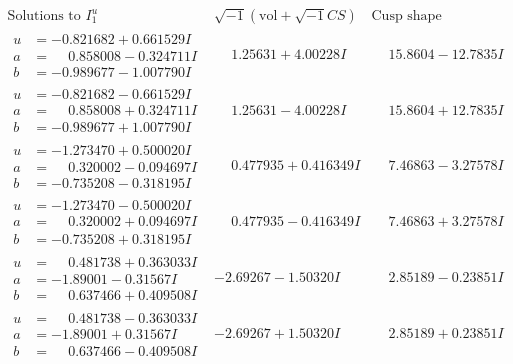 \documentclass[1p]{elsarticle_modified}
\theoremstyle{definition}
\newcommand{\I}{\sqrt{-1}}
\begin{document}
$$\begin{array}{c|c|c}  
\text{Solutions to }I^u_{1}& \I (\text{vol} + \sqrt{-1}CS) & \text{Cusp shape}\\
 \hline 
\begin{aligned}
u &= -0.821682 + 0.661529 I \\
a &= \phantom{-}0.858008 - 0.324711 I \\
b &= -0.989677 - 1.007790 I\end{aligned}
 & \phantom{-}1.25631 + 4.00228 I & \phantom{-}15.8604 - 12.7835 I \\ \hline\begin{aligned}
u &= -0.821682 - 0.661529 I \\
a &= \phantom{-}0.858008 + 0.324711 I \\
b &= -0.989677 + 1.007790 I\end{aligned}
 & \phantom{-}1.25631 - 4.00228 I & \phantom{-}15.8604 + 12.7835 I \\ \hline\begin{aligned}
u &= -1.273470 + 0.500020 I \\
a &= \phantom{-}0.320002 - 0.094697 I \\
b &= -0.735208 - 0.318195 I\end{aligned}
 & \phantom{-}0.477935 + 0.416349 I & \phantom{-}7.46863 - 3.27578 I \\ \hline\begin{aligned}
u &= -1.273470 - 0.500020 I \\
a &= \phantom{-}0.320002 + 0.094697 I \\
b &= -0.735208 + 0.318195 I\end{aligned}
 & \phantom{-}0.477935 - 0.416349 I & \phantom{-}7.46863 + 3.27578 I \\ \hline\begin{aligned}
u &= \phantom{-}0.481738 + 0.363033 I \\
a &= -1.89001 - 0.31567 I \\
b &= \phantom{-}0.637466 + 0.409508 I\end{aligned}
 & -2.69267 - 1.50320 I & \phantom{-}2.85189 - 0.23851 I \\ \hline\begin{aligned}
u &= \phantom{-}0.481738 - 0.363033 I \\
a &= -1.89001 + 0.31567 I \\
b &= \phantom{-}0.637466 - 0.409508 I\end{aligned}
 & -2.69267 + 1.50320 I & \phantom{-}2.85189 + 0.23851 I \\ \hline\begin{aligned}

\end{aligned}
\end{array}$$
\end{document}
